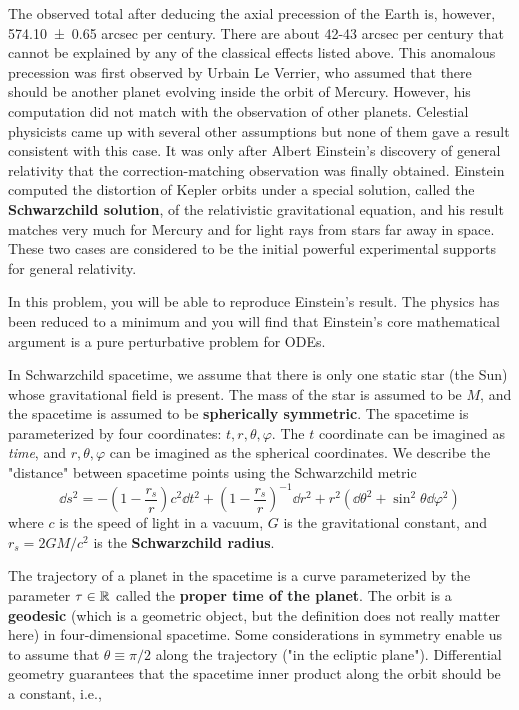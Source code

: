 \documentclass[../psets.tex]{subfiles}
\begin{document}
The observed total after deducing the axial precession of the Earth is, however, \num[separate-uncertainty=true]{574.10\pm 0.65} arcsec per century. There are about 42-43 arcsec per century that cannot be explained by any of the classical effects listed above. This anomalous precession was first observed by Urbain Le Verrier, who assumed that there should be another planet evolving inside the orbit of Mercury. However, his computation did not match with the observation of other planets. Celestial physicists came up with several other assumptions but none of them gave a result consistent with this case. It was only after Albert Einstein's discovery of general relativity that the correction-matching observation was finally obtained. Einstein computed the distortion of Kepler orbits under a special solution, called the \textbf{Schwarzchild solution}, of the relativistic gravitational equation, and his result matches very much for Mercury and for light rays from stars far away in space. These two cases are considered to be the initial powerful experimental supports for general relativity.\par
In this problem, you will be able to reproduce Einstein's result. The physics has been reduced to a minimum and you will find that Einstein's core mathematical argument is a pure perturbative problem for ODEs.\par
In Schwarzchild spacetime, we assume that there is only one static star (the Sun) whose gravitational field is present. The mass of the star is assumed to be $M$, and the spacetime is assumed to be \textbf{spherically symmetric}. The spacetime is parameterized by four coordinates: $t,r,\theta,\varphi$. The $t$ coordinate can be imagined as \emph{time}, and $r,\theta,\varphi$ can be imagined as the spherical coordinates. We describe the "distance" between spacetime points using the Schwarzchild metric
\begin{equation*}
    \dd{s}^2 = -\left( 1-\frac{r_s}{r} \right)c^2\dd{t}^2+\left( 1-\frac{r_s}{r} \right)^{-1}\dd{r}^2+r^2\left( \dd{\theta}^2+\sin^2\theta\dd{\varphi}^2 \right)
\end{equation*}
where $c$ is the speed of light in a vacuum, $G$ is the gravitational constant, and $r_s=2GM/c^2$ is the \textbf{Schwarzchild radius}.\par
The trajectory of a planet in the spacetime is a curve parameterized by the parameter $\tau\in\mathbb{R}$ called the \textbf{proper time of the planet}. The orbit is a \textbf{geodesic} (which is a geometric object, but the definition does not really matter here) in four-dimensional spacetime. Some considerations in symmetry enable us to assume that $\theta\equiv\pi/2$ along the trajectory ("in the ecliptic plane"). Differential geometry guarantees that the spacetime inner product along the orbit should be a constant, i.e.,
\end{document}
